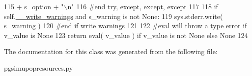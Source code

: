 \begin{DoxyCode}
115                     + s\_option + \textcolor{stringliteral}{"\(\backslash\)n"} 
116         \textcolor{comment}{#end try, except, except, except}
117 
118         \textcolor{keywordflow}{if} self.\hyperlink{classpgsimupopresources_1_1PGSimuPopResources_a83b612b64b7f053995e157b36c86d985}{\_\_write\_warnings} \textcolor{keywordflow}{and} s\_warning \textcolor{keywordflow}{is} \textcolor{keywordflow}{not} \textcolor{keywordtype}{None}:
119             sys.stderr.write( s\_warning )
120         \textcolor{comment}{#end if write warnings }
121 
122         \textcolor{comment}{#eval will throw a type error if v\_value is None}
123         \textcolor{keywordflow}{return} eval( v\_value ) \textcolor{keywordflow}{if} v\_value \textcolor{keywordflow}{is} \textcolor{keywordflow}{not} \textcolor{keywordtype}{None} \textcolor{keywordflow}{else} \textcolor{keywordtype}{None}
124 
\end{DoxyCode}


The documentation for this class was generated from the following file\+:\begin{DoxyCompactItemize}
\item 
pgsimupopresources.\+py\end{DoxyCompactItemize}
